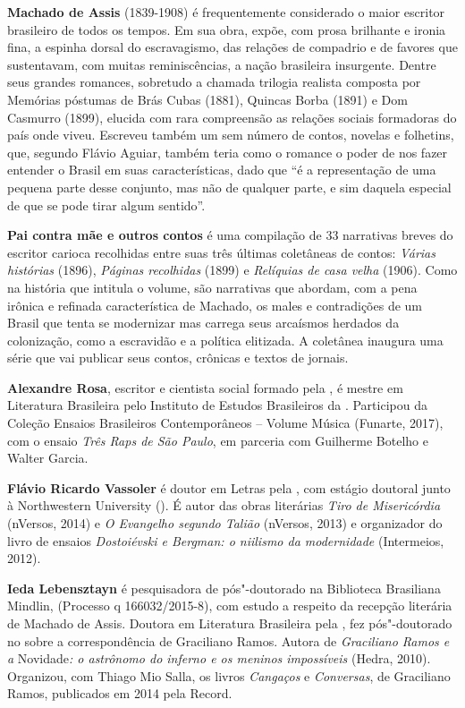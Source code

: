 \textbf{Machado de Assis} (1839-1908) é frequentemente considerado o maior escritor brasileiro de todos os tempos. Em sua obra, expõe, com prosa brilhante e ironia fina, a espinha dorsal do escravagismo, das relações de compadrio e de favores que sustentavam, com muitas reminiscências, a nação brasileira insurgente. Dentre seus grandes romances, sobretudo a chamada trilogia realista composta por Memórias póstumas de Brás Cubas (1881), Quincas Borba (1891) e Dom Casmurro (1899), elucida com rara compreensão as relações sociais formadoras do país onde viveu. Escreveu também um sem número de contos, novelas e folhetins, que, segundo Flávio Aguiar, também teria como o romance o poder de nos fazer entender o Brasil em suas características, dado que “é a representação de uma pequena parte desse conjunto, mas não de qualquer parte, e sim daquela especial de que se pode tirar algum sentido”.

\textbf{Pai contra mãe e outros contos} é uma compilação de 33 narrativas breves do escritor carioca recolhidas entre suas três últimas coletâneas de contos: \emph{Várias histórias} (1896), \emph{Páginas recolhidas} (1899) e \emph{Relíquias de casa velha} (1906). Como na história que intitula o volume, são narrativas que abordam, com a pena irônica e refinada característica de Machado, os males e contradições de um Brasil que tenta se modernizar mas carrega seus arcaísmos herdados da colonização, como a escravidão e a política elitizada. A coletânea inaugura uma série que vai publicar seus contos, crônicas e textos de jornais.  

\textbf{Alexandre Rosa}, escritor e
  cientista social formado pela , é mestre em Literatura
  Brasileira pelo Instituto de Estudos Brasileiros da . Participou da
  Coleção Ensaios Brasileiros Contemporâneos -- Volume Música (Funarte,
  2017), com o ensaio \emph{Três Raps de São Paulo}, em parceria com
  Guilherme Botelho e Walter Garcia.

\textbf{Flávio Ricardo Vassoler} é doutor em Letras pela , com estágio doutoral junto à
  Northwestern University (). É autor das obras literárias \emph{Tiro
  de Misericórdia} (nVersos, 2014) e \emph{O Evangelho segundo Talião}
  (nVersos, 2013) e organizador do livro de ensaios \emph{Dostoiévski e
  Bergman: o niilismo da modernidade} (Intermeios, 2012).

\textbf{Ieda Lebensztayn} é
  pesquisadora de pós"-doutorado na Biblioteca Brasiliana Mindlin,
   (Processo q 166032/2015-8), com estudo a
  respeito da recepção literária de Machado de Assis. Doutora em
  Literatura Brasileira pela , fez pós"-doutorado no 
  sobre a correspondência de Graciliano Ramos. Autora de
  \emph{Graciliano Ramos e a} Novidade\emph{: o astrônomo do inferno e
  os meninos impossíveis} (Hedra, 2010). Organizou, com Thiago Mio
  Salla, os livros \emph{Cangaços} e \emph{Conversas}, de Graciliano
  Ramos, publicados em 2014 pela Record.





